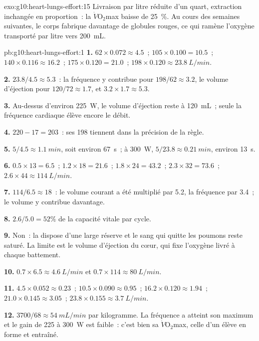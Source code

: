 \begin{solution}{exo:g10:heart-lungs-effort:15}
Livraison par litre réduite d'un quart, extraction inchangée en
proportion~: la $\dot V\!\mathrm{O_2}$max baisse de 25~\%. Au cours des
semaines suivantes, le corps fabrique davantage de globules rouges, ce
qui ramène l'oxygène transporté par litre vers \qty{200}{mL}.
\end{solution}

\begin{solution}{pb:g10:heart-lungs-effort:1}
\textbf{1.} $62 \times 0.072 \approx 4.5$~; $105 \times 0.100 = 10.5$~;
$140 \times 0.116 \approx 16.2$~; $175 \times 0.120 = 21.0$~;
$198 \times 0.120 \approx \qty{23.8}{L/min}$.

\textbf{2.} $23.8/4.5 \approx 5.3$~: la fréquence y contribue pour $198/62
\approx 3.2$, le volume d'éjection pour $120/72 \approx 1.7$, et $3.2 \times
1.7 \approx 5.3$.

\textbf{3.} Au-dessus d'environ \qty{225}{W}, le volume d'éjection
reste à \qty{120}{mL}~; seule la fréquence cardiaque élève encore le
débit.

\textbf{4.} $220 - 17 = 203$~: ses 198 tiennent dans la précision de la règle.

\textbf{5.} $5/4.5 \approx \qty{1.1}{min}$, soit environ \qty{67}{s}~; à
\qty{300}{W}, $5/23.8 \approx \qty{0.21}{min}$, environ \qty{13}{s}.

\textbf{6.} $0.5 \times 13 = 6.5$~; $1.2 \times 18 = 21.6$~; $1.8 \times
24 = 43.2$~; $2.3 \times 32 = 73.6$~; $2.6 \times 44 \approx
\qty{114}{L/min}$.

\textbf{7.} $114/6.5 \approx 18$~: le volume courant a été multiplié par
5.2, la fréquence par 3.4~; le volume y contribue davantage.

\textbf{8.} $2.6/5.0 = 52\%$ de la capacité vitale par cycle.

\textbf{9.} Non~: la  dispose d'une large réserve et le sang
qui quitte les poumons reste saturé. La limite est le volume d'éjection
du cœur, qui fixe l'oxygène livré à chaque battement.

\textbf{10.} $0.7 \times 6.5 \approx \qty{4.6}{L/min}$ et $0.7 \times
114 \approx \qty{80}{L/min}$.

\textbf{11.} $4.5 \times 0.052 \approx 0.23$~; $10.5 \times 0.090
\approx 0.95$~; $16.2 \times 0.120 \approx 1.94$~; $21.0 \times 0.145
\approx 3.05$~; $23.8 \times 0.155 \approx \qty{3.7}{L/min}$.

\textbf{12.} $3700/68 \approx \qty{54}{mL/min}$ par kilogramme. La
fréquence a atteint son maximum et le gain de 225 à \qty{300}{W} est
faible~: c'est bien sa $\dot V\!\mathrm{O_2}$max, celle d'un élève en
forme et entraîné.


\end{solution}
